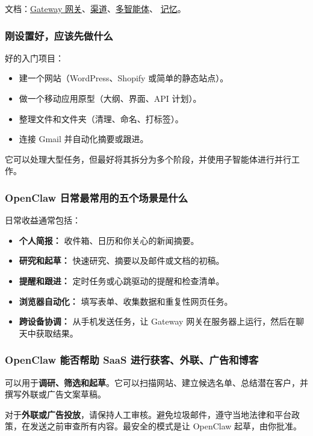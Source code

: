 文档：\href{/gateway}{Gateway 网关}、\href{/channels}{渠道}、\href{/concepts/multi-agent}{多智能体}、
\href{/concepts/memory}{记忆}。

\subsubsection{刚设置好，应该先做什么}


好的入门项目：

\begin{itemize}
  \item 建一个网站（WordPress、Shopify 或简单的静态站点）。
  \item 做一个移动应用原型（大纲、界面、API 计划）。
  \item 整理文件和文件夹（清理、命名、打标签）。
  \item 连接 Gmail 并自动化摘要或跟进。
\end{itemize}


它可以处理大型任务，但最好将其拆分为多个阶段，并使用子智能体进行并行工作。

\subsubsection{OpenClaw 日常最常用的五个场景是什么}


日常收益通常包括：

\begin{itemize}
  \item \textbf{个人简报：} 收件箱、日历和你关心的新闻摘要。
  \item \textbf{研究和起草：} 快速研究、摘要以及邮件或文档的初稿。
  \item \textbf{提醒和跟进：} 定时任务或心跳驱动的提醒和检查清单。
  \item \textbf{浏览器自动化：} 填写表单、收集数据和重复性网页任务。
  \item \textbf{跨设备协调：} 从手机发送任务，让 Gateway 网关在服务器上运行，然后在聊天中获取结果。
\end{itemize}


\subsubsection{OpenClaw 能否帮助 SaaS 进行获客、外联、广告和博客}


可以用于\textbf{调研、筛选和起草}。它可以扫描网站、建立候选名单、总结潜在客户，并撰写外联或广告文案草稿。

对于\textbf{外联或广告投放}，请保持人工审核。避免垃圾邮件，遵守当地法律和平台政策，在发送之前审查所有内容。最安全的模式是让 OpenClaw 起草，由你批准。

